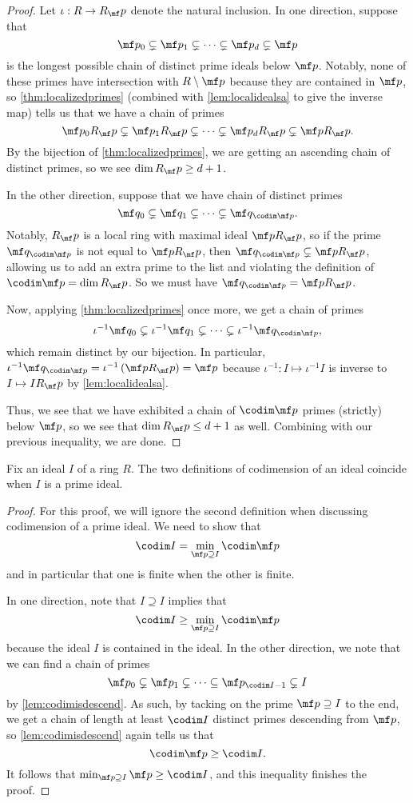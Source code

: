 \begin{proof}
	Let $\iota:R\to R_\mf p$ denote the natural inclusion. In one direction, suppose that
	\[\mf p_0\subsetneq\mf p_1\subsetneq\cdots\subsetneq\mf p_d\subsetneq\mf p\]
	is the longest possible chain of distinct prime ideals below $\mf p$. Notably, none of these primes have intersection with $R\setminus\mf p$ because they are contained in $\mf p$, so \autoref{thm:localizedprimes} (combined with \autoref{lem:localidealsa} to give the inverse map) tells us that we have a chain of primes
	\[\mf p_0R_\mf p\subsetneq\mf p_1R_\mf p\subsetneq\cdots\subsetneq\mf p_dR_\mf p\subsetneq\mf pR_\mf p.\]
	By the bijection of \autoref{thm:localizedprimes}, we are getting an ascending chain of distinct primes, so we see $\dim R_\mf p\ge d+1$.

	In the other direction, suppose that we have chain of distinct primes
	\[\mf q_0\subsetneq\mf q_1\subsetneq\cdots\subsetneq\mf q_{\codim\mf p}.\]
	Notably, $R_\mf p$ is a local ring with maximal ideal $\mf pR_\mf p$, so  if the prime $\mf q_{\codim\mf p}$ is not equal to $\mf pR_\mf p$, then $\mf q_{\codim\mf p}\subsetneq\mf pR_\mf p$, allowing us to add an extra prime to the list and violating the definition of $\codim\mf p=\dim R_\mf p$. So we must have $\mf q_{\codim\mf p}=\mf pR_\mf p$.

	Now, applying \autoref{thm:localizedprimes} once more, we get a chain of primes
	\[\iota^{-1}\mf q_0\subsetneq\iota^{-1}\mf q_1\subsetneq\cdots\subsetneq\iota^{-1}\mf q_{\codim\mf p},\]
	which remain distinct by our bijection. In particular, $\iota^{-1}\mf q_{\codim\mf p}=\iota^{-1}\left(\mf pR_\mf p\right)=\mf p$ because $\iota^{-1}:I\mapsto\iota^{-1}I$ is inverse to $I\mapsto IR_\mf p$ by \autoref{lem:localidealsa}.

	Thus, we see that we have exhibited a chain of $\codim\mf p$ primes (strictly) below $\mf p$, so we see that $\dim R_\mf p\le d+1$ as well. Combining with our previous inequality, we are done.
\end{proof}
\begin{lemma}
	Fix an ideal $I$ of a ring $R$. The two definitions of codimension of an ideal coincide when $I$ is a prime ideal.
\end{lemma}
\begin{proof}
	For this proof, we will ignore the second definition when discussing codimension of a prime ideal. We need to show that
	\[\codim I=\min_{\mf p\supseteq I}\codim\mf p\]
	and in particular that one is finite when the other is finite.

	In one direction, note that $I\supseteq I$ implies that
	\[\codim I\ge\min_{\mf p\supseteq I}\codim\mf p\]
	because the ideal $I$ is contained in the ideal. In the other direction, we note that we can find a chain of primes
	\[\mf p_0\subsetneq\mf p_1\subsetneq\cdots\subseteq\mf p_{\codim I-1}\subsetneq I\]
	by \autoref{lem:codimisdescend}. As such, by tacking on the prime $\mf p\supseteq I$ to the end, we get a chain of length at least $\codim I$ distinct primes descending from $\mf p$, so \autoref{lem:codimisdescend} again tells us that
	\[\codim\mf p\ge\codim I.\]
	It follows that $\min_{\mf p\supseteq I}\mf p\ge\codim I$, and this inequality finishes the proof.
\end{proof}

